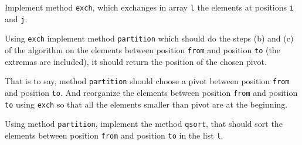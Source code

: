 \documentclass[correction]{exercices}
\begin{document}
\begin{question}
Implement method \verb!exch!, which exchanges
in array \verb!l! the elements at positions \verb!i! and \verb!j!.
\end{question}
\begin{question}
Using \verb!exch! implement method \verb!partition! which should do the steps (b)
and (c) of the algorithm on the elements between position \verb!from!
and position \verb!to! (the extremas are included), it should return
the position of the chosen pivot.

That is to say, method \verb!partition! should choose a pivot between
position \verb!from! and position \verb!to!. And reorganize the elements
between position \verb!from! and position \verb!to! using \verb!exch!
so that all the elements smaller than pivot are at the beginning.
\end{question}
\begin{question}
Using method \verb!partition!,
implement the method \verb!qsort!,
that should sort the elements between position \verb!from!
and position \verb!to! in the list \verb!l!.
\end{question}
\end{document}
